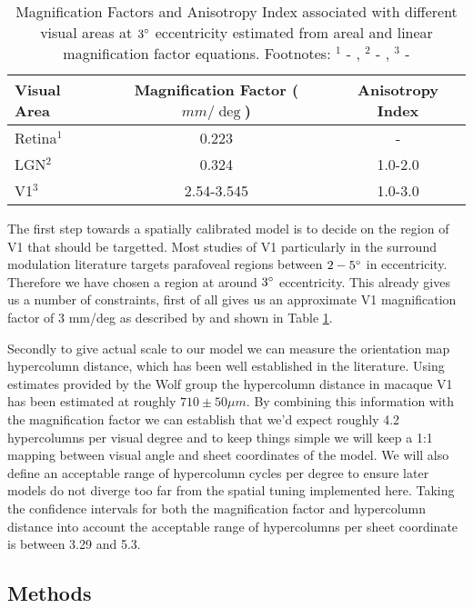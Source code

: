 \begin{table}
\centering
\begin{tabular}{l | c c}
  \hline
  \hline
  Visual Area     & Magnification Factor ($mm/\deg$) & Anisotropy Index \\
  \hline
  Retina$^1$      & 0.223                            & -                      \\
  LGN$^2$         & 0.324                             & 1.0-2.0                \\
  V1$^3$          & 2.54-3.545                       & 1.0-3.0                \\
  \hline
\end{tabular}
\caption[]%
{Magnification Factors and Anisotropy Index associated with different visual areas at $3\degree$ eccentricity estimated from areal and linear magnification factor equations. Footnotes: $^1$ - \cite{Perry1985}, $^2$ - \cite{Connolly1984}, $^3$ - \cite{VanEssen1984}}
\label{MFs}
\end{table}

The first step towards a spatially calibrated model is to decide on
the region of V1 that should be targetted. Most studies of V1
particularly in the surround modulation literature targets parafoveal
regions between $2-5\degree$ in eccentricity. Therefore we have chosen
a region at around $3\degree$ eccentricity. This already gives us a
number of constraints, first of all gives us an approximate V1
magnification factor of 3 mm/deg as described by \cite{VanEssen1984}
and shown in Table \ref{MFs}.

Secondly to give actual scale to our model we can measure the
orientation map hypercolumn distance, which has been well established
in the literature. Using estimates provided by the Wolf group the
hypercolumn distance in macaque V1 has been estimated at roughly \(710
\pm 50 \mu m\). By combining this information with the magnification
factor we can establish that we'd expect roughly 4.2 hypercolumns per
visual degree and to keep things simple we will keep a 1:1 mapping
between visual angle and sheet coordinates of the model. We will also
define an acceptable range of hypercolumn cycles per degree to ensure
later models do not diverge too far from the spatial tuning
implemented here. Taking the confidence intervals for both the
magnification factor and hypercolumn distance into account the
acceptable range of hypercolumns per sheet coordinate is between 3.29
and 5.3.

\subsection{Methods}

